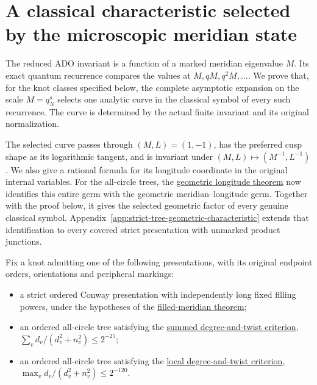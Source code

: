 \chapter{A classical characteristic selected by the microscopic meridian state}\label{app:filtered-characteristic}

The reduced ADO invariant is a function of a marked meridian eigenvalue \(M\). Its exact quantum recurrence compares the values at \(M,qM,q^2M,\ldots\). We prove that, for the knot classes specified below, the complete asymptotic expansion on the scale \(M=q_N^s\) selects one analytic curve in the classical symbol of every such recurrence. The curve is determined by the actual finite invariant and its original normalization.

The selected curve passes through \((M,L)=(1,-1)\), has the preferred cusp shape as its logarithmic tangent, and is invariant under \((M,L)\mapsto(M^{-1},L^{-1})\). We also give a rational formula for its longitude coordinate in the original internal variables. For the all-circle trees, the \hyperref[app:geometric-characteristic]{geometric longitude theorem} now identifies this entire germ with the geometric meridian--longitude germ. Together with the proof below, it gives the selected geometric factor of every genuine classical symbol. Appendix~\ref{app:strict-tree-geometric-characteristic} extends that identification to every covered strict presentation with unmarked product junctions.

Fix a knot admitting one of the following presentations, with its original endpoint orders, orientations and peripheral markings:

\begin{itemize}
\item
  a strict ordered Conway presentation with independently long fixed filling powers, under the hypotheses of the \href{https://sashakolpakov.github.io/murakamis_dream/notes/actual_main_meridian_filled_volume.html}{filled-meridian theorem};
\item
  an ordered all-circle tree satisfying the \href{https://sashakolpakov.github.io/murakamis_dream/notes/actual_all_circle_quantitative_volume.html}{summed degree-and-twist criterion}, \(\sum_v d_v/(d_v^2+n_v^2)\le2^{-25}\);
\item
  an ordered all-circle tree satisfying the \href{https://sashakolpakov.github.io/murakamis_dream/notes/actual_all_circle_local_message_volume.html}{local degree-and-twist criterion}, \(\max_v d_v/(d_v^2+n_v^2)\le2^{-120}\).
\end{itemize}

